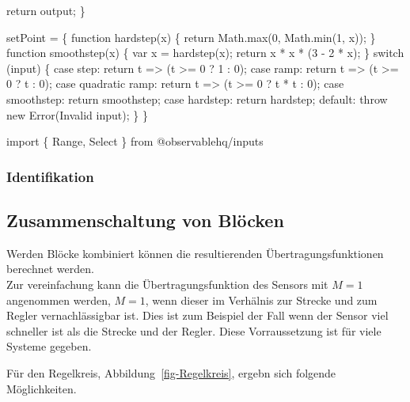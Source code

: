 \documentclass[
  letterpaper,
  DIV=11]{scrreprt}
\newenvironment{Shaded}{\begin{snugshade}}{\end{snugshade}}
\newcommand{\NormalTok}[1]{\textcolor[rgb]{0.00,0.23,0.31}{#1}}
\begin{document}
\begin{Shaded}
\begin{Highlighting}[]
\NormalTok{  return output;}
\NormalTok{\}}

\NormalTok{setPoint = \{}
\NormalTok{  function hardstep(x) \{}
\NormalTok{    return Math.max(0, Math.min(1, x));}
\NormalTok{  \}}
\NormalTok{  function smoothstep(x) \{}
\NormalTok{    var x = hardstep(x);}
\NormalTok{    return x * x * (3 {-} 2 * x);}
\NormalTok{  \}}
\NormalTok{  switch (input) \{}
\NormalTok{    case \textquotesingle{}step\textquotesingle{}:}
\NormalTok{      return t =\textgreater{} (t \textgreater{}= 0 ? 1 : 0);}
\NormalTok{    case \textquotesingle{}ramp\textquotesingle{}:}
\NormalTok{      return t =\textgreater{} (t \textgreater{}= 0 ? t : 0);}
\NormalTok{    case \textquotesingle{}quadratic ramp\textquotesingle{}:}
\NormalTok{      return t =\textgreater{} (t \textgreater{}= 0 ? t * t : 0);}
\NormalTok{    case \textquotesingle{}smoothstep\textquotesingle{}:}
\NormalTok{      return smoothstep;}
\NormalTok{    case \textquotesingle{}hardstep\textquotesingle{}:}
\NormalTok{      return hardstep;}
\NormalTok{    default:}
\NormalTok{      throw new Error(\textquotesingle{}Invalid input\textquotesingle{});}
\NormalTok{  \}}
\NormalTok{\}}

\NormalTok{import \{ Range, Select \} from \textquotesingle{}@observablehq/inputs\textquotesingle{}}
\end{Highlighting}
\end{Shaded}

\subsubsection{Identifikation}\label{identifikation}

\subsection{Zusammenschaltung von
Blöcken}\label{zusammenschaltung-von-bluxf6cken}

Werden Blöcke kombiniert können die resultierenden
Übertragungsfunktionen berechnet werden.\\
Zur vereinfachung kann die Übertragungsfunktion des Sensors mit \(M=1\)
angenommen werden, \(M=1\), wenn dieser im Verhälnis zur Strecke und zum
Regler vernachlässigbar ist. Dies ist zum Beispiel der Fall wenn der
Sensor viel schneller ist als die Strecke und der Regler. Diese
Vorraussetzung ist für viele Systeme gegeben.

Für den Regelkreis, Abbildung~\ref{fig-Regelkreis}, ergebn sich folgende
Möglichkeiten.
\end{document}
